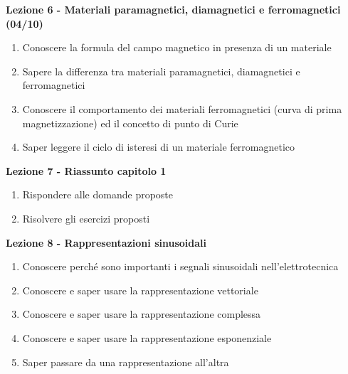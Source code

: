 \documentclass{article}
\begin{document}
	\begin{center}
		\textbf{Lezione 6 - Materiali paramagnetici, diamagnetici e ferromagnetici (04/10)}
		\begin{enumerate}
			\item Conoscere la formula del campo magnetico in presenza di un materiale
			\item Sapere la differenza tra materiali paramagnetici, diamagnetici e ferromagnetici
			\item Conoscere il comportamento dei materiali ferromagnetici (curva di prima magnetizzazione) ed il concetto di punto di Curie
			\item Saper leggere il ciclo di isteresi di un materiale ferromagnetico
		\end{enumerate}
	\end{center}
	
	\begin{center}
	\textbf{Lezione 7 - Riassunto capitolo 1}
	\begin{enumerate}
	\item Rispondere alle domande proposte
	\item Risolvere gli esercizi proposti
	\end{enumerate}
	\end{center}
	
	\begin{center}
	\textbf{Lezione 8 - Rappresentazioni sinusoidali}
	\begin{enumerate}
	\item Conoscere perché sono importanti i segnali sinusoidali nell'elettrotecnica
	\item Conoscere e saper usare la rappresentazione vettoriale
	\item Conoscere e saper usare la rappresentazione complessa
	\item Conoscere e saper usare la rappresentazione esponenziale
	\item Saper passare da una rappresentazione all'altra
	\end{enumerate}
	\end{center}
	
\end{document}
